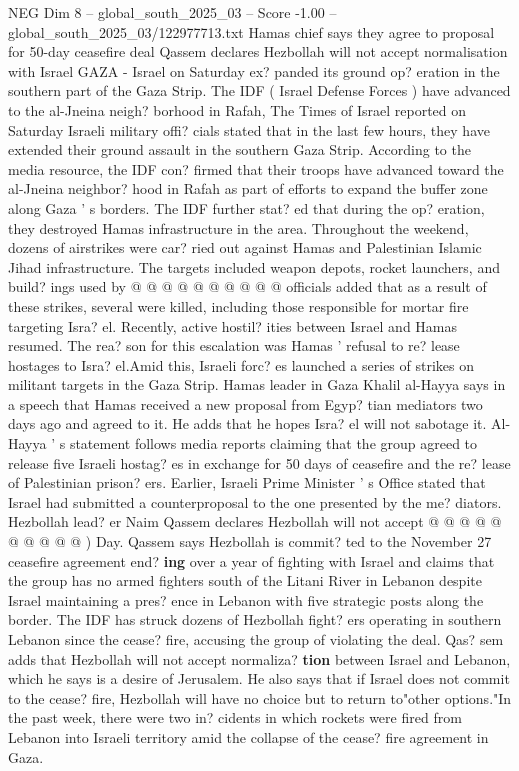 \begin{textsample}{NEG Dim 8 – global\_south\_2025\_03 – Score -1.00 – global\_south\_2025\_03/122977713.txt}  \label{ex:f8_neg_298}
Hamas chief says they agree to proposal for 50-day ceasefire deal Qassem declares Hezbollah will not accept normalisation with Israel GAZA - Israel on Saturday ex? panded its ground op? eration in the southern part of the Gaza Strip.
The IDF ( Israel Defense Forces ) have advanced to the al-Jneina neigh? borhood in Rafah, The Times of Israel reported on Saturday Israeli military offi? cials stated that in the last few hours, they have extended their ground assault in the southern Gaza Strip.
According to the media resource, the IDF con? firmed that their troops have advanced toward the al-Jneina neighbor? hood in Rafah as part of efforts to expand the buffer zone along Gaza ' s borders.
The IDF further stat? ed that during the op? eration, they destroyed Hamas infrastructure in the area.
Throughout the weekend, dozens of airstrikes were car? ried out against Hamas and Palestinian Islamic Jihad infrastructure.
The targets included weapon depots, rocket launchers, and build? ings used by @ @ @ @ @ @ @ @ @ @ officials added that as a result of these strikes, several were killed, including those responsible for mortar fire targeting Isra? el.
Recently, active hostil? ities between Israel and Hamas resumed.
The rea? son for this escalation was Hamas ' refusal to re? lease hostages to Isra? el.Amid this, Israeli forc? es launched a series of strikes on militant targets in the Gaza Strip.
Hamas leader in Gaza Khalil al-Hayya says in a speech that Hamas received a new proposal from Egyp? tian mediators two days ago and agreed to it.
He adds that he hopes Isra? el will not sabotage it.
Al-Hayya ' s statement follows media reports claiming that the group agreed to release five Israeli hostag? es in exchange for 50 days of ceasefire and the re? lease of Palestinian prison? ers.
Earlier, Israeli Prime Minister ' s Office stated that Israel had submitted a counterproposal to the one presented by the me? diators.
Hezbollah lead? er Naim Qassem declares Hezbollah will not accept @ @ @ @ @ @ @ @ @ @ ) Day.
Qassem says Hezbollah is commit? ted to the November 27 ceasefire agreement end? \textbf{ing} over a year of fighting with Israel and claims that the group has no armed fighters south of the Litani River in Lebanon despite Israel maintaining a pres? ence in Lebanon with five strategic posts along the border.
The IDF has struck dozens of Hezbollah fight? ers operating in southern Lebanon since the cease? fire, accusing the group of violating the deal.
Qas? sem adds that Hezbollah will not accept normaliza? \textbf{tion} between Israel and Lebanon, which he says is a desire of Jerusalem.
He also says that if Israel does not commit to the cease? fire, Hezbollah will have no choice but to return to"other options."In the past week, there were two in? cidents in which rockets were fired from Lebanon into Israeli territory amid the collapse of the cease? fire agreement in Gaza.

\end{textsample}

